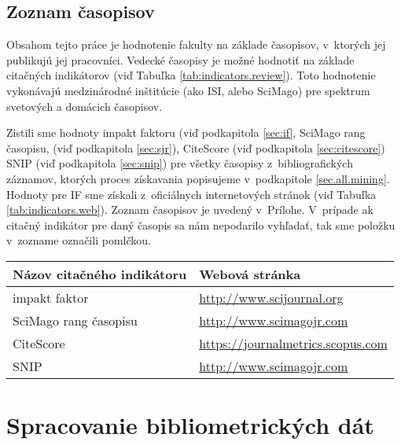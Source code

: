 \subsection{Zoznam časopisov}
\label{sec:journal.mining}

Obsahom tejto práce je hodnotenie fakulty na základe časopisov, v~ktorých jej
publikujú jej pracovníci. Vedecké časopisy je možné hodnotiť na základe
citačných indikátorov (viď Tabuľka \ref{tab:indicators.review}). Toto hodnotenie
vykonávajú medzinárodné inštitúcie (ako ISI, alebo SciMago) pre spektrum
svetových a domácich časopisov.

Zistili sme hodnoty impakt faktoru (viď podkapitola \ref{sec:if}, SciMago rang
časopisu, (viď podkapitola \ref{sec:sjr}), CiteScore (viď podkapitola
\ref{sec:citescore}) SNIP (viď podkapitola \ref{sec:snip}) pre všetky časopisy
z~bibliografických záznamov, ktorých proces získavania popisujeme v~podkapitole
\ref{sec.all.mining}.  Hodnoty pre IF sme získali z~oficiálnych internetových
stránok (viď Tabuľka \ref{tab:indicators.web}).  Zoznam časopisov je uvedený
v~Prílohe.  V~prípade ak citačný indikátor pre daný časopis sa nám nepodarilo
vyhľadať, tak sme položku v~zozname označili pomlčkou.

\begin{SCtable}
  \centering\small
  \caption[Webové stránky citačných indikátorov na hodnotenie časopisov]%
  {Zoznam citačných indikátorov na hodnotenie časopisov, s~odkazmi na oficiálne
    webové stránky}
  \label{tab:indicators.web}
  \begin{tabular}{ll}
    \toprule
    Názov citačného indikátoru      & Webová stránka\\
    \midrule
    impakt faktor         & {\footnotesize \url{http://www.scijournal.org}}         \\
    SciMago rang časopisu & {\footnotesize \url{http://www.scimagojr.com}}          \\
    CiteScore             & {\footnotesize \url{https://journalmetrics.scopus.com}} \\
    SNIP                  & {\footnotesize \url{http://www.scimagojr.com}}          \\
    \bottomrule
  \end{tabular}
\end{SCtable}

\section{Spracovanie bibliometrických dát}

